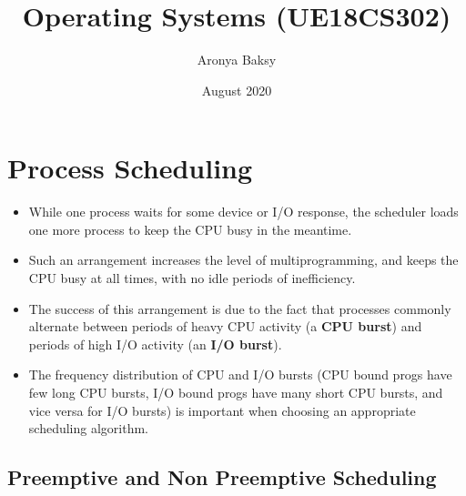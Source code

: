\documentclass{article}
\title{Operating Systems (UE18CS302)}
\author{Aronya Baksy}
\date{August 2020}
\begin{document}
\maketitle

\section{Process Scheduling}
\begin{itemize}
    \item While one process waits for some device or I/O response, the scheduler loads one more process to keep the CPU busy in the meantime. 
    
    \item Such an arrangement increases the level of multiprogramming, and keeps the CPU busy at all times, with no idle periods of inefficiency. 
    
    \item The success of this arrangement is due to the fact that processes commonly alternate between periods of heavy CPU activity (a \textbf{CPU burst}) and periods of high I/O activity (an \textbf{I/O burst}). 
    
    \item The frequency distribution of CPU and I/O bursts (CPU bound progs have few long CPU bursts, I/O bound progs have many short CPU bursts, and vice versa for I/O bursts) is important when choosing an appropriate scheduling algorithm.
\end{itemize}

\subsection{Preemptive and Non Preemptive Scheduling}
\end{document}
